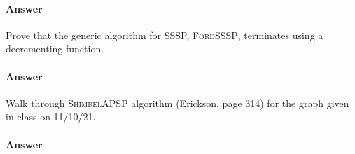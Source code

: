 \documentclass{article}
\begin{document}
\paragraph{Answer}

\collab{\todo{}}

Prove that the generic algorithm for SSSP, \textsc{FordSSSP}, terminates using a
decrementing function.

\paragraph{Answer}

\collab{\todo{}}

Walk through \textsc{ShimbelAPSP} algorithm (Erickson, page 314) for the graph given in class on
11/10/21.

\paragraph{Answer}
\end{document}

